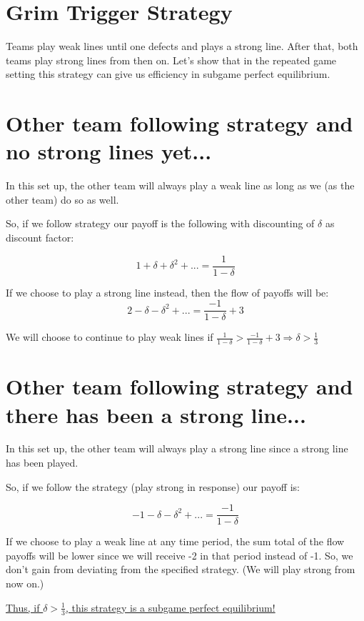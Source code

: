 \documentclass{article}
\begin{document}
\section*{Grim Trigger Strategy}
Teams play weak lines until one defects and plays a strong line. After that, both teams play strong lines from then on. Let's show that in the repeated game setting this strategy can give us efficiency in subgame perfect equilibrium.

\section{Other team following strategy and no strong lines yet...}
In this set up, the other team will always play a weak line as long as we (as the other team) do so as well.

So, if we follow strategy our payoff is the following with discounting of $\delta$ as discount factor:

$$1+\delta+\delta^2+...=\frac{1}{1-\delta}$$

If we choose to play a strong line instead, then the flow of payoffs will be:
$$2-\delta-\delta^2+...=\frac{-1}{1-\delta}+3$$

We will choose to continue to play weak lines if $\frac{1}{1-\delta}>\frac{-1}{1-\delta}+3 \Rightarrow \delta>\frac{1}{3}$


\section{Other team following strategy and there has been a strong line...}
In this set up, the other team will always play a strong line since a strong line has been played.

So, if we follow the strategy (play strong in response) our payoff is:

$$-1-\delta-\delta^2+...=\frac{-1}{1-\delta}$$

If we choose to play a weak line at any time period, the sum total of the flow payoffs will be lower since we will receive -2 in that period instead of -1. So, we don't gain from deviating from the specified strategy. (We will play strong from now on.)

\bigskip
\underline{Thus, if $\delta>\frac{1}{3}$, this strategy is a subgame perfect equilibrium!}
\end{document}
